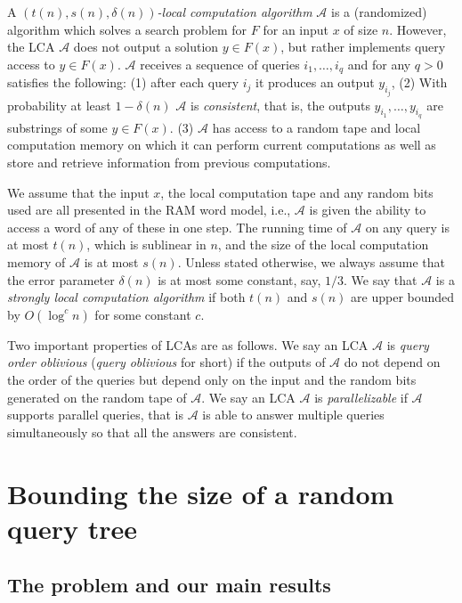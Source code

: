 \documentclass[english, oribibl]{llncs}
\newcommand{\mcA}{{\mathcal A}}
\begin{document}
A {\em $(t(n), s(n), \delta(n))$-local computation algorithm} $\mcA$
is a (randomized) algorithm which solves a search problem for $F$ for an input $x$ of size $n$.
However, the LCA $\mcA$ does not output a solution $y\in F(x)$, but rather
implements query access to $y \in F(x)$. $\mcA$ receives a sequence of queries $i_1,\ldots,i_q$ and for any $q>0$ satisfies the following:
(1) after each query $i_j$ it produces an output $y_{i_j}$,
(2) With probability at least $1-\delta(n)$ $\mcA$ is \emph{consistent}, that is, the outputs $y_{i_1},\ldots, y_{i_q}$ are substrings of some $y \in F(x)$.
(3) $\mcA$ has access to a random tape and local computation memory on which
it can perform current computations as well as store and retrieve information from previous computations.

We assume that the input $x$, the local computation tape and any
random bits used are all presented in the RAM word model, i.e.,
$\mcA$ is given the ability to access a word of any of these in one step.
The running time of $\mcA$ on any query is at most $t(n)$, which is sublinear in $n$,
and the size of the local computation memory of $\mcA$ is at most $s(n)$.
Unless stated otherwise, we always assume that the error parameter
$\delta(n)$ is at most some constant, say, $1/3$.
We say that  $\mcA$ is a {\em strongly local computation algorithm}
if both $t(n)$ and $s(n)$ are upper bounded by $O(\log^{c}n)$ for some constant $c$.

Two important properties of LCAs are as follows.
We say an LCA $\mcA$ is \emph{query order oblivious} (\emph{query oblivious} for short)
if the outputs of $\mcA$ do not depend on the order of the queries but
depend only on the input and the random bits generated on the random tape of $\mcA$.
We say an LCA $\mcA$ is \emph{parallelizable} if $\mcA$
supports parallel queries, that is $\mcA$ is able to answer multiple queries
simultaneously so that all the answers are consistent.



\section{Bounding the size of a random query tree}
\label{section:tree_size}

\subsection{The problem and our main results}\label{Sect:query_tree}
\end{document}
